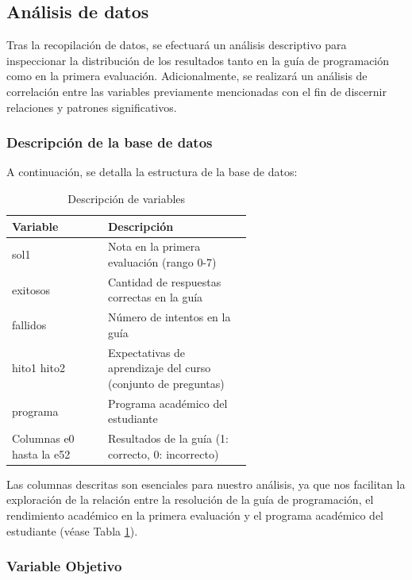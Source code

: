 \subsection{Análisis de datos}

Tras la recopilación de datos, se efectuará un análisis descriptivo para inspeccionar la distribución de los resultados tanto en la guía de programación como en la primera evaluación. Adicionalmente, se realizará un análisis de correlación entre las variables previamente mencionadas con el fin de discernir relaciones y patrones significativos.

\subsubsection{Descripción de la base de datos}

A continuación, se detalla la estructura de la base de datos:

\begin{table}[H]
    \centering
    \caption{Descripción de variables}
    \begin{tabular}{lp{0.6\linewidth}}
        \toprule
        \textbf{Variable} & \textbf{Descripción} \\
        \midrule
        sol1 & Nota en la primera evaluación (rango 0-7) \\
        exitosos & Cantidad de respuestas correctas en la guía \\
        fallidos & Número de intentos en la guía \\
        hito1 hito2 & Expectativas de aprendizaje del curso (conjunto de preguntas) \\
        programa & Programa académico del estudiante \\
        Columnas e0 hasta la e52 & Resultados de la guía (1: correcto, 0: incorrecto) \\
        \bottomrule
    \end{tabular}
    \label{tab:variables}
\end{table}

Las columnas descritas son esenciales para nuestro análisis, ya que nos facilitan la exploración de la relación entre la resolución de la guía de programación, el rendimiento académico en la primera evaluación y el programa académico del estudiante (véase Tabla \ref{tab:variables}).

\subsubsection{Variable Objetivo}


